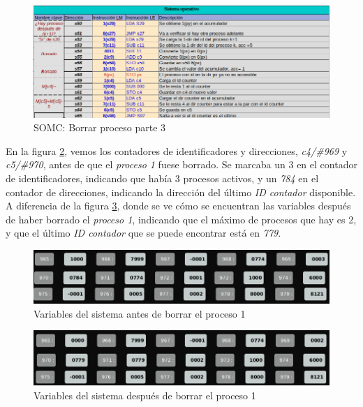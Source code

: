 \documentclass[letterpaper,12pt,oneside]{book}
\begin{document}
		\begin{figure}[h]		
			\centering
			\includegraphics[scale=0.53]{media/CARDIACC/SO_Borrar3.png}
			\caption{ SOMC: Borrar proceso parte 3 }
			\label{fig:somcBorrar3}
		\end{figure}		
		
		
		En la figura \ref{fig:ZVBeforeProceso1Erased}, vemos los contadores de identificadores
		y direcciones, \textit{c4/\#969} y \textit{c5/\#970}, antes de que el \textit{proceso 1} fuese borrado.
		Se marcaba un 3 en el contador de identificadores, indicando que había 3 procesos activos,  y un \textit{784} en el contador de direcciones, 
		indicando la dirección del último \textit{ID contador} disponible. A diferencia de la figura \ref{fig:ZVAfterProceso1Erased}, donde se ve cómo 
		se encuentran las variables después de haber borrado el \textit{proceso 1}, indicando que el máximo de procesos que hay es 2, y que  
		el último \textit{ID contador} que se puede encontrar está en \textit{779}.
		
		\begin{figure}[h]		
			\centering
			\includegraphics[scale=0.45]{media/CARDIACC/ZVBeforeProceso1Erased.png}
			\caption{ Variables del sistema antes de borrar el proceso 1}
			\label{fig:ZVBeforeProceso1Erased}
		\end{figure}
		
		\begin{figure}[h]		
			\centering
			\includegraphics[scale=0.45]{media/CARDIACC/ZVAfterProceso1Erased.png}
			\caption{ Variables del sistema después de borrar el proceso 1}
			\label{fig:ZVAfterProceso1Erased}
		\end{figure}
		
\end{document}
